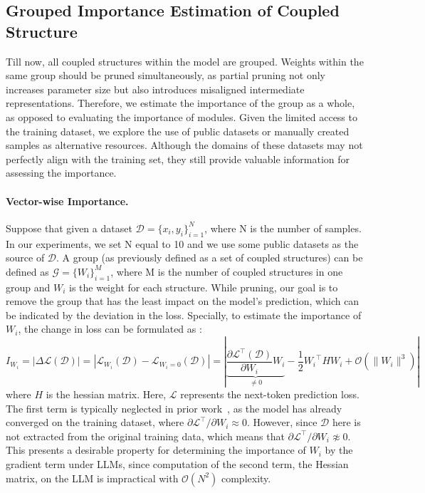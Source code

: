 \subsection{Grouped Importance Estimation of Coupled Structure} \label{sec:importance}

Till now, all coupled structures within the model are grouped. Weights within the same group should be pruned simultaneously, as partial pruning not only increases parameter size but also introduces misaligned intermediate representations. Therefore, we estimate the importance of the group as a whole, as opposed to evaluating the importance of modules. Given the limited access to the training dataset, we explore the use of public datasets or manually created samples as alternative resources. Although the domains of these datasets may not perfectly align with the training set, they still provide valuable information for assessing the importance.

\paragraph{Vector-wise Importance.} Suppose that given a dataset $\mathcal{D} = \{x_i, y_i\}_{i=1}^N$, where N is the number of samples. In our experiments, we set N equal to 10 and we use some public datasets as the source of $\mathcal{D}$. A group (as previously defined as a set of coupled structures) can be defined as $\mathcal{G} = \{W_i\}_{i=1}^M$, where M is the number of coupled structures in one group and $W_i$ is the weight for each structure. While pruning, our goal is to remove the group that has the least impact on the model's prediction, which can be indicated by the deviation in the loss. Specially, to estimate the importance of $W_i$, the change in loss can be formulated as \cite{lecun1989optimal}:
\begin{equation}
    I_{W_i} = | \Delta \mathcal{L}(\mathcal{D})| = |\mathcal{L}_{W_i}(\mathcal{D}) - \mathcal{L}_{W_i=0}(\mathcal{D})| =| \underbrace{\frac{\partial \mathcal{L}^{\top}(\mathcal{D})}{\partial W_i} W_i}_{\neq 0}-\frac{1}{2} {W_i}^{\top} H W_i + \mathcal{O}\left(\| W_i \|^3\right) | \label{eq:taylor}
\end{equation} 
where $H$ is the hessian matrix. Here, $\mathcal{L}$ represents the next-token prediction loss. The first term is typically neglected in prior work~\cite{lecun1989optimal,wang2019eigendamage,frantar2023massive}, as the model has already converged on the training dataset, where ${\partial \mathcal{L}^{\top}}/{\partial W_i} \approx 0$. However, since $\mathcal{D}$ here is not extracted from the original training data, which means that ${\partial \mathcal{L}^{\top}}/{\partial W_i} \not \approx 0$. This presents a desirable property for determining the importance of $W_i$ by the gradient term under LLMs, since computation of the second term, the Hessian matrix, on the LLM is impractical with $\mathcal{O}\left(N^2\right)$ complexity. 

